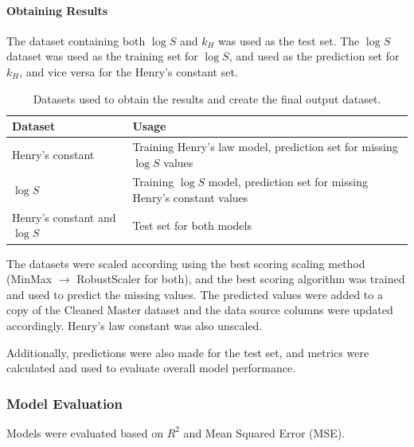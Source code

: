 \documentclass[11pt, titlepage]{article}
\begin{document}
\paragraph*{Obtaining Results}
The dataset containing both {$\log S$} and {$k_H$} was used as the test set. The {$\log S$} dataset was used as the training set for {$\log S$}, and used as the prediction set for {$k_H$}, and vice versa for the Henry's constant set. 
\begin{table}[H]
    \centering
    \small
    \begin{tabularx}{\linewidth}{|l|X|}
        \hline
        \textbf{Dataset} & \textbf{Usage} \\
        \hline
        Henry's constant & Training Henry's law model, prediction set for missing {$\log S$} values \\
        $\log S$ & Training {$\log S$} model, prediction set for missing Henry's constant values \\
        Henry's constant and {$\log S$} & Test set for both models \\
        \hline
    \end{tabularx}
    \caption{Datasets used to obtain the results and create the final output dataset.}
    \label{tab:PredSets}
\end{table}

The datasets were scaled according using the best scoring scaling method (MinMax $\rightarrow$ RobustScaler for both), and the best scoring algorithm was trained and used to predict the missing values. The predicted values were added to a copy of the Cleaned Master dataset and the data source columns were updated accordingly. Henry's law constant was also unscaled.

Additionally, predictions were also made for the test set, and metrics were calculated and used to evaluate overall model performance.

\subsubsection{Model Evaluation}
\label{subsubsec:modelEvaluation}
Models were evaluated based on $R^2$ and Mean Squared Error (MSE). %
\end{document}

